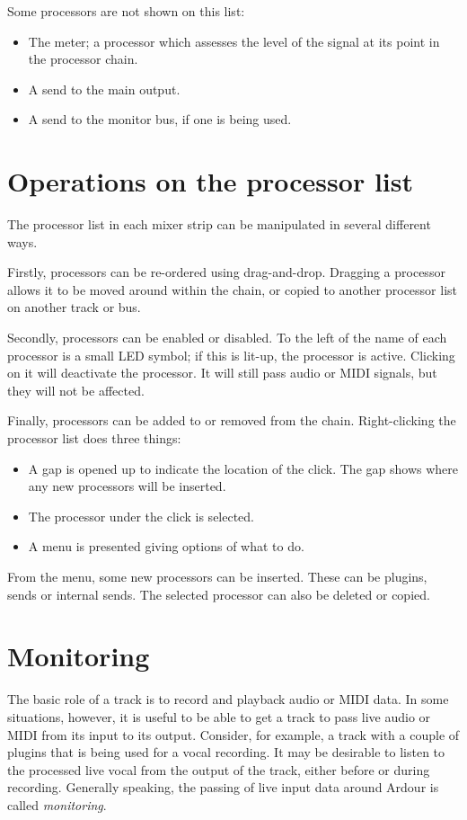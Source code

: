 \documentclass[10pt,a4paper]{book}
\begin{document}
{Some processors are not shown on this list:

\begin{itemize}
\item The meter; a processor which assesses the level of the signal at
  its point in the processor chain.
\item A send to the main output.
\item A send to the monitor bus, if one is being used.
\end{itemize}


\section{Operations on the processor list}

The processor list in each mixer strip can be manipulated in several
different ways.

Firstly, processors can be re-ordered using drag-and-drop.  Dragging a
processor allows it to be moved around within the chain, or copied to
another processor list on another track or bus.

Secondly, processors can be enabled or disabled.  To the left of the
name of each processor is a small LED symbol; if this is lit-up, the
processor is active.  Clicking on it will deactivate the processor.
It will still pass audio or MIDI signals, but they will not be
affected.

Finally, processors can be added to or removed from the chain.
Right-clicking the processor list does three things:

\begin{itemize}
\item A gap is opened up to indicate the location of the click.  The
  gap shows where any new processors will be inserted.
\item The processor under the click is selected.
\item A menu is presented giving options of what to do.
\end{itemize}

From the menu, some new processors can be inserted.  These can be
plugins, sends or internal sends.  The selected processor can also be
deleted or copied.



\section{Monitoring}

The basic role of a track is to record and playback audio or MIDI
data.  In some situations, however, it is useful to be able to get a
track to pass live audio or MIDI from its input to its output.
Consider, for example, a track with a couple of plugins that is being
used for a vocal recording.  It may be desirable to listen to the
processed live vocal from the output of the track, either before or
during recording.  Generally speaking, the passing of live input data
around Ardour is called \emph{monitoring}.



}
\end{document}

